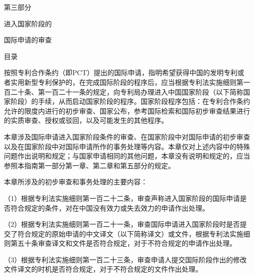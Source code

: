 \cleardoublepage{}\resetchapters
\thispagestyle{plainempty}\hypertarget{gpos.p3}{}\begingroup\centering\guidecenterpage
\dadati\fontsize{29.04bp}{43bp}\selectfont
\vspace*{221bp}
第三部分\par
进入国家阶段的\par
国际申请的审查\par
{}
{}
\endgroup\clearpage
\cleardoublepage\pagestyle{tocpage}
\gdef\guidetabcontent{\hbox{第}\hbox{三}\hbox{部}\hbox{分}}
{\centering\guidecenterpage\heiti\fontsize{14.04bp}{21bp}\selectfont 目\quad 录\par}
\vspace{6bp}
\clearpage\pagestyle{main}
按照专利合作条约（即PCT）提出的国际申请，指明希望获得中国的发明专利或者实用新型专利保护的，在完成国际阶段的程序后，应当根据专利法实施细则第一百二十条、第一百二十一条的规定，向专利局办理进入中国国家阶段（以下简称国家阶段）的手续，从而启动国家阶段的程序。国家阶段程序包括：在专利合作条约允许的限度内进行的初步审查、国家公布，参考国际检索和国际初步审查结果进行的实质审查、授权或驳回，以及可能发生的其他程序。

本章涉及国际申请进入国家阶段条件的审查、在国家阶段中对国际申请的初步审查以及在国家阶段中对国际申请所作的事务处理等内容。本章仅对上述内容中的特殊问题作出说明和规定；与国家申请相同的其他问题，本章没有说明和规定的，应当参照本指南第一部分第一章、第二章和第五部分的规定。

本章所涉及的初步审查和事务处理的主要内容：

{\setlength{\parindent}{17.8bp}（1）根据专利法实施细则第一百二十二条，审查声称进入国家阶段的国际申请是否符合规定的条件，对在中国没有效力或失去效力的申请作出处理。\par}

{\setlength{\parindent}{17.8bp}（2）根据专利法实施细则第一百二十一条，审查国际申请进入国家阶段时是否提交了符合规定的原始申请的中文译文（以下简称译文）或文件，根据专利法实施细则第五十条审查译文和文件是否符合规定，对于不符合规定的申请作出处理。\par}

{\setlength{\parindent}{17.8bp}（3）根据专利法实施细则第一百二十三条，审查申请人提交国际阶段作出的修改文件译文的时机是否符合规定，对于不符合规定的文件作出处理。\par}

